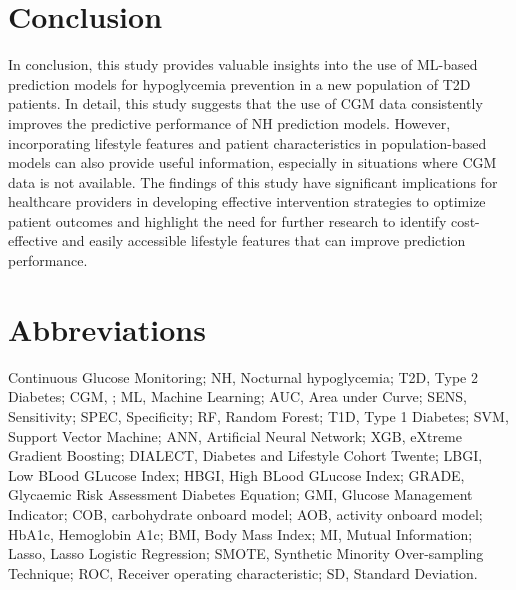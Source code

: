\section{Conclusion}
\label{Conclusion}

In conclusion, this study provides valuable insights into the use of ML-based prediction models for hypoglycemia prevention in a new population of T2D patients. In detail, this study suggests that the use of CGM data consistently improves the predictive performance of NH prediction models. However, incorporating lifestyle features and patient characteristics in population-based models can also provide useful information, especially in situations where CGM data is not available. The findings of this study have significant implications for healthcare providers in developing effective intervention strategies to optimize patient outcomes and highlight the need for further research to identify cost-effective and easily accessible lifestyle features that can improve prediction performance. 

\section{Abbreviations}
Continuous Glucose Monitoring; NH, Nocturnal hypoglycemia; T2D, Type 2 Diabetes; CGM, ; ML, Machine Learning; AUC, Area under Curve; SENS, Sensitivity; SPEC, Specificity; RF, Random Forest; T1D, Type 1 Diabetes; SVM, Support Vector Machine; ANN, Artificial Neural Network; XGB, eXtreme Gradient Boosting; DIALECT, Diabetes and Lifestyle Cohort Twente; LBGI, Low BLood GLucose Index; HBGI, High BLood GLucose Index; GRADE, Glycaemic Risk
Assessment Diabetes Equation; GMI, Glucose Management Indicator; COB, carbohydrate onboard model; AOB, activity onboard model; HbA1c, Hemoglobin A1c; BMI, Body Mass Index; MI, Mutual Information; Lasso, Lasso Logistic Regression; SMOTE, Synthetic Minority Over-sampling Technique; ROC, Receiver operating characteristic; SD, Standard Deviation.
\label{Abbreviations}
